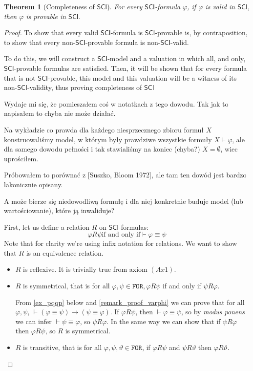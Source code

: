 \documentclass{article}
\newtheorem{theorem}{Theorem}
\theoremstyle{definition}
\theoremstyle{definition}
\theoremstyle{definition}
\newcommand*{\id}{\equiv}
\newcommand*{\ra}{\rightarrow}
\newcommand*{\FOR}{\texttt{FOR}}
\newcommand{\SCI}{$\mathsf{SCI}$\xspace}
\begin{document}
\begin{theorem}[Completeness of \SCI]
    For every \SCI-formula $\varphi$, if $\varphi$ is valid in \SCI, then $\varphi$ is provable in \SCI.
\end{theorem}
\begin{proof}
    To show that every valid \SCI-formula is \SCI-provable is, by contraposition, to show that every non-\SCI-provable formula is non-\SCI-valid.

    To do this, we will construct a \SCI-model and a valuation in which all, and
    only, \SCI-provable formulas are satisfied. Then, it will be shown that for
    every formula that is not \SCI-provable, this model and this valuation will be
    a witness of its non-\SCI-validity, thus proving completeness of \SCI

    {\color{red}Wydaje mi się, że pomieszałem coś w notatkach z tego dowodu. Tak jak to napisałem to chyba nie może działać.

        Na wykładzie co prawda dla każdego niesprzecznego zbioru formuł $X$
        konstruowaliśmy model, w którym były prawdziwe wszystkie formuły $X \vdash
            \varphi$, ale dla samego dowodu pełności i tak stawialiśmy na koniec (chyba?)
        $X = \emptyset$, wiec uprościłem.

        Próbowałem to porównać z [Suszko, Bloom 1972], ale tam ten dowód jest bardzo
        lakonicznie opisany.

        A może bierze się niedowodliwą formułę i dla niej konkretnie buduje model (lub
        wartościowanie), które ją inwaliduje?}

    First, let us define a relation $R$ on \SCI-formulas: $$ \varphi R \psi \text{
            if and only if} \vdash \varphi \id \psi $$
    Note that for clarity we're using infix notation for relations. We want to show
    that $R$ is an equivalence relation.
    \begin{itemize}[]
        \item $R$ is reflexive. It is trivially true from axiom $(Ax1)$.
        \item $R$ is symmetrical, that is for all $\varphi, \psi \in \FOR, \varphi R \psi$ if and only if $\psi R \varphi$.

              From \cref{ex_pqqp} below and \cref{remark_proof_varphi} we can prove that for
              all $\varphi, \psi$, $\vdash (\varphi \id \psi) \ra (\psi \id \varphi)$. If
              $\varphi R \psi$, then $\vdash \varphi \id \psi$, so by \emph{modus ponens} we
              can infer $\vdash \psi \id \varphi$, so $\psi R \varphi$. In the same way we
              can show that if $\psi R \varphi$ then $\varphi R \psi$, so $R$ is symmetrical.
        \item $R$ is transitive, that is for all $\varphi, \psi, \vartheta \in \FOR$, if $\varphi R \psi$ and $\psi R \vartheta$ then $\varphi R \vartheta$.


\end{itemize}
\end{proof}
\end{document}
